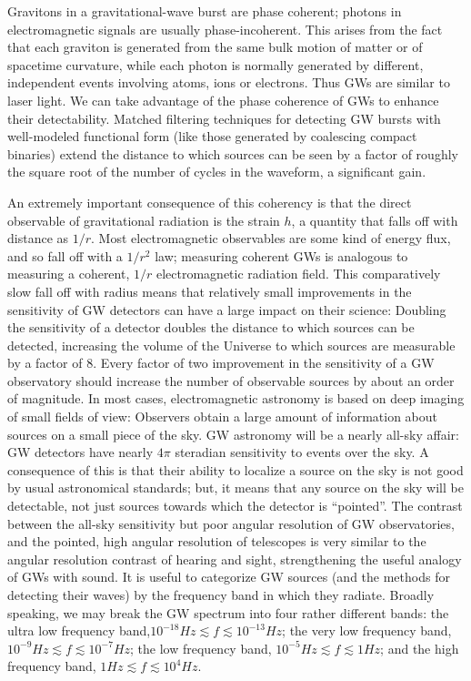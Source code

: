 \documentclass[binding=0.6cm, LaM]{sapthesis}
\begin{document}
Gravitons in a gravitational-wave burst are phase coherent; photons in electromagnetic signals are usually phase-incoherent. This arises from the fact that each graviton is generated from the same bulk motion of matter or of spacetime curvature, while each photon is normally generated by different, independent events involving atoms, ions or electrons. Thus GWs are similar to laser light. We can take advantage of the phase coherence of GWs to enhance their detectability. Matched filtering techniques for detecting GW bursts with well-modeled functional form (like those generated by coalescing compact binaries) extend the distance to which sources can be seen by a factor of roughly the square root of the number of cycles in the waveform, a significant gain.

An extremely important consequence of this coherency is that the direct observable of gravitational radiation is the strain $h$, a quantity that falls off with distance as $1/r$. Most electromagnetic observables are some kind of energy flux, and so fall off with a $1/r^2$ law; measuring coherent GWs is analogous to measuring a coherent, $1/r$ 
electromagnetic radiation field. This comparatively slow fall off with radius means that relatively small improvements in the sensitivity of GW detectors can have a large impact on their science: Doubling the sensitivity of a detector doubles the distance to which sources can be detected, increasing the volume of the Universe to which sources are measurable by a factor of 8. Every factor of two improvement in the sensitivity of a GW observatory should increase the number of observable sources by about an order of magnitude. 
In most cases, electromagnetic astronomy is based on deep imaging of small fields of view: Observers obtain a large amount of information about sources on a small piece of the sky. GW astronomy will be a nearly all-sky affair: GW detectors have nearly $4\pi$ steradian sensitivity to events over the sky. A consequence of this is that their ability to localize a source on the sky is not good by usual astronomical standards; but, it means that any source on the sky will be detectable, not just sources towards which the detector is “pointed”. The contrast between the all-sky sensitivity but poor angular resolution of GW observatories, and the pointed, high angular resolution of telescopes is very similar to the angular resolution contrast of hearing and sight, strengthening the useful analogy of GWs with sound. 
It is useful to categorize GW sources (and the methods for detecting their waves) by the frequency band in which they radiate. Broadly speaking, we may break the GW spectrum into four rather different bands: the ultra low frequency band,$10^{-18}Hz \apprle f \apprle 10^{-13} Hz$; the very low frequency band, $10^{-9} Hz \apprle f \apprle 10^{-7} Hz$; the low frequency band, $10^{-5} Hz \apprle f \apprle 1Hz$; and the high frequency band, $1Hz \apprle f \apprle 10^4 Hz$.
\end{document}
